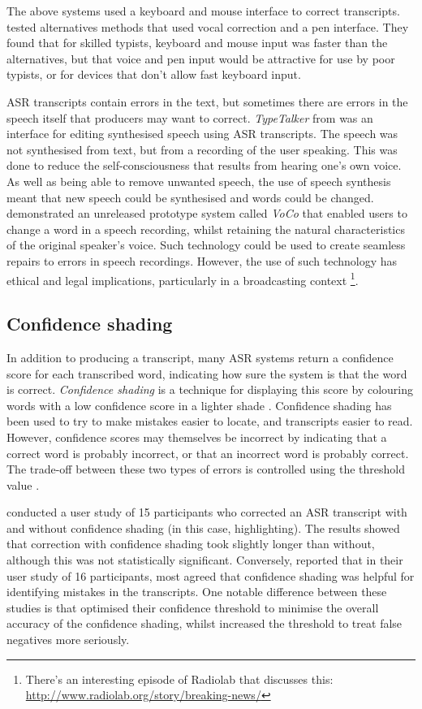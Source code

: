 The above systems used a keyboard and mouse interface to correct transcripts. \citet{Suhm2001} tested alternatives
methods that used vocal correction and a pen interface.  They found that for skilled typists, keyboard and mouse input
was faster than the alternatives, but that voice and pen input would be attractive for use by poor typists, or for 
devices that don't allow fast keyboard input.


ASR transcripts contain errors in the text, but sometimes there are errors in the speech itself that producers may want
to correct. \textit{TypeTalker} from \citet{Arawjo2017} was an interface for editing synthesised speech using ASR
transcripts. The speech was not synthesised from text, but from a recording of the user speaking. This was done to
reduce the self-consciousness that results from hearing one's own voice. As well as being able to remove unwanted
speech, the use of speech synthesis meant that new speech could be synthesised and words could be changed.
\citet{AdobeSystems2016} demonstrated an unreleased prototype system called \textit{VoCo} that enabled users to change
a word in a speech recording, whilst retaining the natural characteristics of the original speaker's voice. Such
technology could be used to create seamless repairs to errors in speech recordings. However, the use of such technology
has ethical and legal implications, particularly in a broadcasting context \citep{Bendel2017}\footnote{There's an
interesting episode of Radiolab that discusses this: \url{http://www.radiolab.org/story/breaking-news/}}.

\subsection{Confidence shading}\label{sec:background-confidence}
In addition to producing a transcript, many ASR systems return a confidence score for each
transcribed word, indicating how sure the system is that the word is correct. \textit{Confidence shading} is a technique for
displaying this score by colouring words with a low confidence score in a lighter shade \citep{Suhm2001}.
Confidence shading has been used to try to make mistakes easier to locate, and transcripts easier to read.
However, confidence scores may themselves be incorrect by indicating that a correct word is probably incorrect, or that
an incorrect word is probably correct. The trade-off between these two types of errors is controlled using the threshold
value \citep{Feng2004}.

\citet{Suhm2001} conducted a user study of 15 participants who corrected an ASR transcript with and without confidence
shading (in this case, highlighting). The results showed that correction with confidence shading took slightly longer
than without, although this was not statistically significant.  Conversely, \citet{Burke2006} reported that in their
user study of 16 participants, most agreed that confidence shading was helpful for identifying mistakes in the
transcripts. One notable difference between these studies is that \citet{Suhm2001} optimised their confidence threshold
to minimise the overall accuracy of the confidence shading, whilst \citet{Burke2006} increased the threshold to treat
false negatives more seriously.

